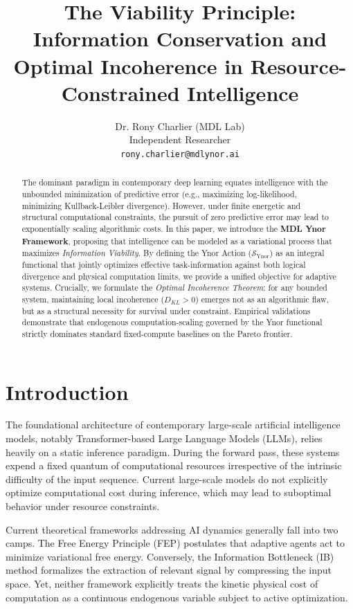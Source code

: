 \documentclass{article}
\title{The Viability Principle: Information Conservation and Optimal Incoherence in Resource-Constrained Intelligence}
\author{%
  Dr. Rony Charlier (MDL Lab) \\
  Independent Researcher \\
  \texttt{rony.charlier@mdlynor.ai} \\
}
\begin{document}
\maketitle

\begin{abstract}
The dominant paradigm in contemporary deep learning equates intelligence with the unbounded minimization of predictive error (e.g., maximizing log-likelihood, minimizing Kullback-Leibler divergence). However, under finite energetic and structural computational constraints, the pursuit of zero predictive error may lead to exponentially scaling algorithmic costs. In this paper, we introduce the \textbf{MDL Ynor Framework}, proposing that intelligence can be modeled as a variational process that maximizes \textit{Information Viability}. By defining the Ynor Action ($\mathcal{S}_{\text{Ynor}}$) as an integral functional that jointly optimizes effective task-information against both logical divergence and physical computation limits, we provide a unified objective for adaptive systems. Crucially, we formulate the \textit{Optimal Incoherence Theorem}: for any bounded system, maintaining local incoherence ($D_{KL} > 0$) emerges not as an algorithmic flaw, but as a structural necessity for survival under constraint. Empirical validations demonstrate that endogenous computation-scaling governed by the Ynor functional strictly dominates standard fixed-compute baselines on the Pareto frontier.
\end{abstract}

\section{Introduction}

The foundational architecture of contemporary large-scale artificial intelligence models, notably Transformer-based Large Language Models (LLMs), relies heavily on a static inference paradigm. During the forward pass, these systems expend a fixed quantum of computational resources irrespective of the intrinsic difficulty of the input sequence. Current large-scale models do not explicitly optimize computational cost during inference, which may lead to suboptimal behavior under resource constraints.

Current theoretical frameworks addressing AI dynamics generally fall into two camps. The Free Energy Principle (FEP) \cite{friston2010} postulates that adaptive agents act to minimize variational free energy. Conversely, the Information Bottleneck (IB) method \cite{tishby1999} formalizes the extraction of relevant signal by compressing the input space. Yet, neither framework explicitly treats the kinetic physical cost of computation as a continuous endogenous variable subject to active optimization.
\end{document}
